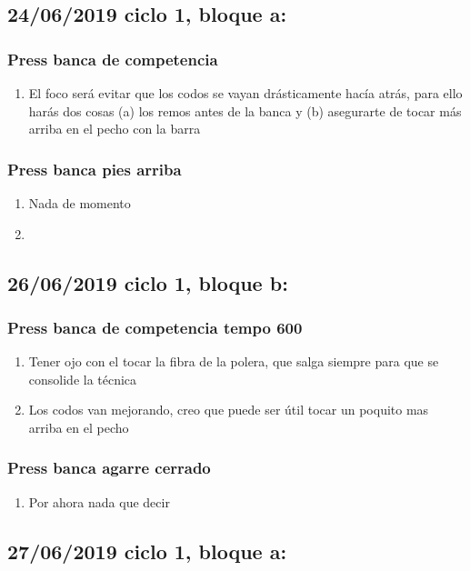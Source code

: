 \documentclass[11pt]{article}
\begin{document}
\subsection{24/06/2019 ciclo 1, bloque a:}
\label{sec:orgcf1420b}
\subsubsection{Press banca de competencia}
\label{sec:org8a6395c}
\begin{enumerate}
\item El foco será evitar que los codos se vayan drásticamente hacía
atrás, para ello harás dos cosas (a) los remos antes de la banca y
(b) asegurarte de tocar más arriba en el pecho con la barra
\end{enumerate}
\subsubsection{Press banca pies arriba}
\label{sec:org7c65008}
\begin{enumerate}
\item Nada de momento
\item 
\end{enumerate}
\subsection{26/06/2019 ciclo 1, bloque b:}
\label{sec:orge7a6fb3}
\subsubsection{Press banca de competencia tempo 600}
\label{sec:org08cee48}
\begin{enumerate}
\item Tener ojo con el tocar la fibra de la polera, que salga siempre
para que se consolide la técnica
\item Los codos van mejorando, creo que puede ser útil tocar un poquito
mas arriba en el pecho
\end{enumerate}
\subsubsection{Press banca agarre cerrado}
\label{sec:org5678241}
\begin{enumerate}
\item Por ahora nada que decir
\end{enumerate}
\subsection{27/06/2019 ciclo 1, bloque a:}
\label{sec:orgf498b6a}
\end{document}
